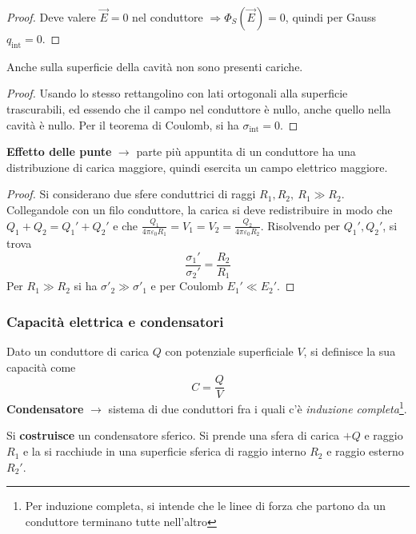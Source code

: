 \documentclass[a4paper]{scrartcl}
\numberwithin{equation}{subsection}
\theoremstyle{style1}
\newenvironment{boxenv}[1][]{
    \begin{eqbox}[#1]
    }{
   \end{eqbox}
}
\begin{document}
\begin{boxenv}[]
\begin{proof}
	Deve valere $\vec{E}=0$ nel conduttore $\Rightarrow \Phi_S(\vec{E})=0$, quindi per Gauss $q_\text{int} = 0$.
\end{proof}
\end{boxenv}
\noindent Anche sulla superficie della cavit\`a non sono presenti cariche.
\begin{boxenv}[]
\begin{proof}
	Usando lo stesso rettangolino con lati ortogonali alla superficie trascurabili, ed essendo che il campo nel conduttore \`e nullo, anche quello nella cavit\`a \`e nullo. Per il teorema di Coulomb, si ha $\sigma_\text{int}=0$.
\end{proof}
\end{boxenv}
\noindent \textbf{Effetto delle punte} $\to$ parte pi\`u appuntita di un conduttore ha una distribuzione di carica maggiore, quindi esercita un campo elettrico maggiore. 
\begin{boxenv}[]
\begin{proof}
	Si considerano due sfere conduttrici di raggi $R_1, R_2 , \ R_1 \gg R_2$. Collegandole con un filo conduttore, la carica si deve redistribuire in modo che $Q_1 + Q_2 = Q_1' +Q_2'$ e che $\frac{Q_1}{4\pi \varepsilon _0R_1}=V_1 = V_2=\frac{Q_2}{4\pi \varepsilon _0 R_2}$. Risolvendo per $Q_1', Q_2'$, si trova 
	\begin{equation}
		\frac{\sigma _1' }{\sigma_2'}= \frac{R_2}{R_1}
	\end{equation}
	Per $R_1\gg R_2$ si ha $\sigma '_2\gg\sigma '_1$ e per Coulomb $E_1' \ll E_2'$.
\end{proof}
\end{boxenv}

\subsubsection{Capacit\`a elettrica e condensatori}
Dato un conduttore di carica $Q$ con potenziale superficiale $V$, si definisce la sua capacit\`a come
\begin{equation}
	C = \frac{Q}{V}
\end{equation}
\textbf{Condensatore} $\to$ sistema di due conduttori fra i quali c'\`e \textit{induzione completa}\footnote{Per induzione completa, si intende che le linee di forza che partono da un conduttore terminano tutte nell'altro}.

Si \textbf{costruisce} un condensatore sferico. Si prende una sfera di carica $+Q$ e raggio $R_1$ e la si racchiude in una superficie sferica di raggio interno $R_2$ e raggio esterno $R_2'$.
\end{document}

